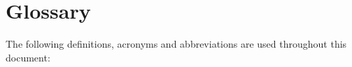 
\chapter{Glossary}

The following definitions, acronyms and abbreviations are used throughout this document:
\begin{enumerate}


\end{enumerate}
